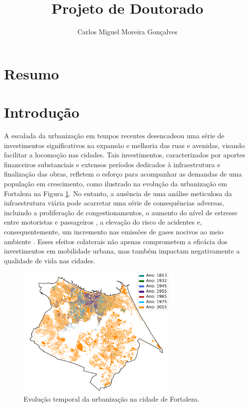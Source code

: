\documentclass{article}
\title{Projeto de Doutorado}
\author{Carlos Miguel Moreira Gonçalves}
\begin{document}
\maketitle

\section{Resumo}

\newpage

\section{Introdução}



A escalada da urbanização \cite{urbanization} em tempos recentes desencadeou uma série de investimentos significativos na expansão e melhoria das ruas e avenidas, visando facilitar a locomoção nas cidades. Tais investimentos, caracterizados por aportes financeiros substanciais e extensos períodos dedicados à infraestrutura e finalização das obras, refletem o esforço para acompanhar as demandas de uma população em crescimento, como ilustrado na evolução da urbanização em Fortaleza na Figura \ref{fig:urbanizacao}. No entanto, a ausência de uma análise meticulosa da infraestrutura viária pode acarretar uma série de consequências adversas, incluindo a proliferação de congestionamentos, o aumento do nível de estresse entre motoristas e passageiros \cite{Hegewald2020,Adli2017}, a elevação do risco de acidentes e, consequentemente, um incremento nas emissões de gases nocivos ao meio ambiente \citep{Wang2018}. Esses efeitos colaterais não apenas comprometem a eficácia dos investimentos em mobilidade urbana, mas também impactam negativamente a qualidade de vida nas cidades.

\begin{figure}[H]
    \centering
    \includegraphics[width=0.7\textwidth]{img/urbanizacao.png}
    \caption{Evolução temporal da urbanização na cidade de Fortaleza.}
    \label{fig:urbanizacao}
\end{figure}
\end{document}
